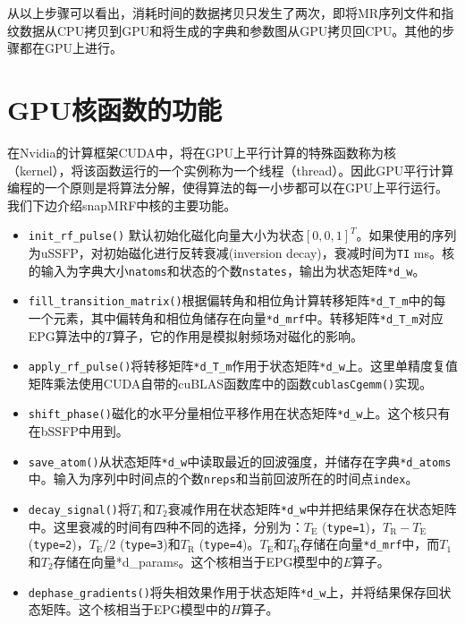 从以上步骤可以看出，消耗时间的数据拷贝只发生了两次，即将MR序列文件和指纹数据从CPU拷贝到GPU和将生成的字典和参数图从GPU拷贝回CPU。其他的步骤都在GPU上进行。

\section{GPU核函数的功能}
在Nvidia的计算框架CUDA中，将在GPU上平行计算的特殊函数称为核（kernel），将该函数运行的一个实例称为一个线程（thread）。因此GPU平行计算编程的一个原则是将算法分解，使得算法的每一小步都可以在GPU上平行运行。我们下边介绍snapMRF中核的主要功能。

\begin{itemize}
	\item \texttt{init\_rf\_pulse()} 默认初始化磁化向量大小为状态$[0,0,1]^T$。如果使用的序列为uSSFP，对初始磁化进行反转衰减(inversion decay)，衰减时间为\texttt{TI} ms。核的输入为字典大小\texttt{natoms}和状态的个数\texttt{nstates}，输出为状态矩阵\texttt{*d\_w}。 
	
	\item \texttt{fill\_transition\_matrix()}根据偏转角和相位角计算转移矩阵\texttt{*d\_T\_m}中的每一个元素，其中偏转角和相位角储存在向量\texttt{*d\_mrf}中。转移矩阵\texttt{*d\_T\_m}对应EPG算法中的$T$算子，它的作用是模拟射频场对磁化的影响。
	
	\item \texttt{apply\_rf\_pulse()}将转移矩阵\texttt{*d\_T\_m}作用于状态矩阵\texttt{*d\_w}上。这里单精度复值矩阵乘法使用CUDA自带的cuBLAS函数库中的函数\texttt{cublasCgemm()}实现。
	
	\item \texttt{shift\_phase()}磁化的水平分量相位平移作用在状态矩阵\texttt{*d\_w}上。这个核只有在bSSFP中用到。
	
	\item \texttt{save\_atom()}从状态矩阵\texttt{*d\_w}中读取最近的回波强度，并储存在字典\texttt{*d\_atoms}中。输入为序列中时间点的个数\texttt{nreps}和当前回波所在的时间点\texttt{index}。
	
	\item \texttt{decay\_signal()}将$T_1$和$T_2$衰减作用在状态矩阵\texttt{*d\_w}中并把结果保存在状态矩阵中。这里衰减的时间有四种不同的选择，分别为：$T_\mathrm{E}$ (\texttt{type=1})，$T_\mathrm{R}-T_\mathrm{E}$ (\texttt{type=2})，$T_\mathrm{E}/2$ (\texttt{type=3})和$T_\mathrm{R}$ (\texttt{type=4})。$T_\mathrm{E}$和$T_\mathrm{R}$存储在向量\texttt{*d\_mrf}中，而$T_1$和$T_2$存储在向量{*d\_params}。这个核相当于EPG模型中的$E$算子。
	
	\item \texttt{dephase\_gradients()}将失相效果作用于状态矩阵\texttt{*d\_w}上，并将结果保存回状态矩阵。这个核相当于EPG模型中的$H$算子。
\end{itemize}

